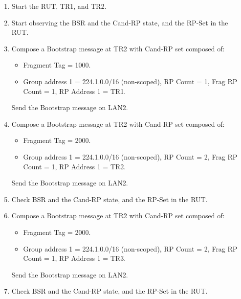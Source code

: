 \documentclass[11pt]{report}
\begin{document}
\begin{enumerate}

  \item Start the RUT, TR1, and TR2.

  \item Start observing the BSR and the Cand-RP state, and the RP-Set in the
  RUT.

  \item Compose a Bootstrap message at TR2 with Cand-RP set composed of:

  \begin{itemize}

    \item Fragment Tag = 1000.

    \item Group address 1 = 224.1.0.0/16 (non-scoped),
    RP Count = 1, Frag RP Count = 1, RP Address 1 = TR1.

  \end{itemize}

  Send the Bootstrap message on LAN2.

  \item Compose a Bootstrap message at TR2 with Cand-RP set composed of:

  \begin{itemize}

    \item Fragment Tag = 2000.

    \item Group address 1 = 224.1.0.0/16 (non-scoped),
    RP Count = 2, Frag RP Count = 1, RP Address 1 = TR2.

  \end{itemize}

  Send the Bootstrap message on LAN2.

  \item Check BSR and the Cand-RP state, and the RP-Set in the RUT.

  \item Compose a Bootstrap message at TR2 with Cand-RP set composed of:

  \begin{itemize}

    \item Fragment Tag = 2000.

    \item Group address 1 = 224.1.0.0/16 (non-scoped),
    RP Count = 2, Frag RP Count = 1, RP Address 1 = TR3.

  \end{itemize}

  Send the Bootstrap message on LAN2.

  \item Check BSR and the Cand-RP state, and the RP-Set in the RUT.

\end{enumerate}
\end{document}
